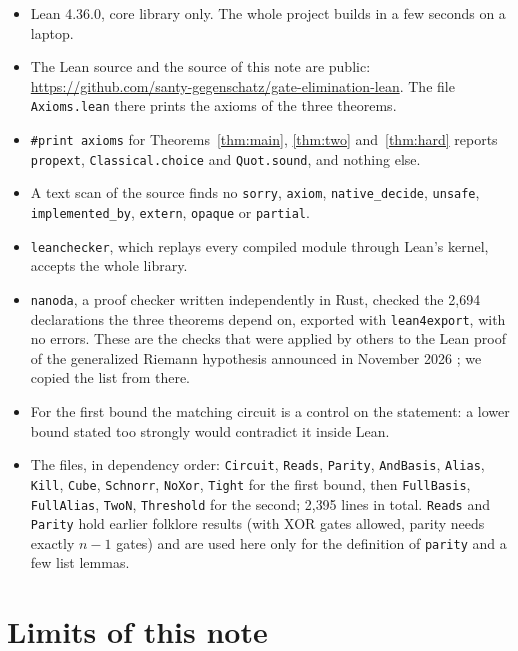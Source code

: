 \documentclass[11pt]{amsart}
\theoremstyle{definition}
\theoremstyle{remark}
\newcommand{\lean}[1]{\texttt{#1}}
\begin{document}
\begin{itemize}
\item Lean 4.36.0, core library only. The whole project builds in a few seconds on a laptop.
\item The Lean source and the source of this note are public:
  \url{https://github.com/santy-gegenschatz/gate-elimination-lean}. The file
  \lean{Axioms.lean} there prints the axioms of the three theorems.
\item \lean{\#print axioms} for Theorems~\ref{thm:main}, \ref{thm:two} and~\ref{thm:hard} reports \lean{propext},
  \lean{Classical.choice} and \lean{Quot.sound}, and nothing else.
\item A text scan of the source finds no \lean{sorry}, \lean{axiom}, \lean{native\_decide},
  \lean{unsafe}, \lean{implemented\_by}, \lean{extern}, \lean{opaque} or \lean{partial}.
\item \lean{leanchecker}, which replays every compiled module through Lean's kernel, accepts
  the whole library.
\item \lean{nanoda}, a proof checker written independently in Rust, checked the 2{,}694
  declarations the three theorems depend on, exported with \lean{lean4export}, with no errors.
  These are the checks that were applied by others to the Lean proof of the generalized
  Riemann hypothesis announced in November 2026 \cite{Rubinstein26}; we copied the list from there.
\item For the first bound the matching circuit is a control on the statement: a lower bound stated too strongly
  would contradict it inside Lean.
\item The files, in dependency order: \lean{Circuit}, \lean{Reads}, \lean{Parity},
  \lean{AndBasis}, \lean{Alias}, \lean{Kill}, \lean{Cube}, \lean{Schnorr}, \lean{NoXor},
  \lean{Tight} for the first bound, then \lean{FullBasis}, \lean{FullAlias}, \lean{TwoN},
  \lean{Threshold} for the second; 2{,}395 lines in total. \lean{Reads} and \lean{Parity} hold earlier folklore
  results (with XOR gates allowed, parity needs exactly $n-1$ gates) and are used here only
  for the definition of \lean{parity} and a few list lemmas.
\end{itemize}

\section{Limits of this note}
\end{document}
